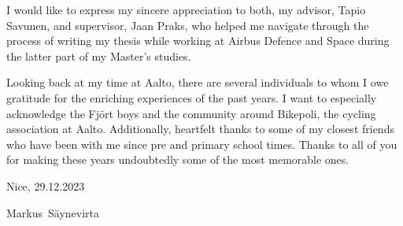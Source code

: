 \documentclass[english, 12pt, a4paper, elec, utf8, a-1b, online]{aaltothesis}
\begin{document}
I would like to express my sincere appreciation to both, my advisor, Tapio Savunen, and supervisor, Jaan Praks, who helped me navigate through the process of writing my thesis while working at Airbus Defence and Space during the latter part of my Master's studies.

Looking back at my time at Aalto, there are several individuals to whom I owe gratitude for the enriching experiences of the past years. I want to especially acknowledge the Fjört boys and the community around Bikepoli, the cycling association at Aalto. Additionally, heartfelt thanks to some of my closest friends who have been with me since pre and primary school times. Thanks to all of you for making these years undoubtedly some of the most memorable ones.

\vspace{5cm}
Nice, 29.12.2023

\vspace{5mm}
{\hfill Markus\ Säynevirta \hspace{1cm}}

\newpage

\thesistableofcontents

\end{document}
